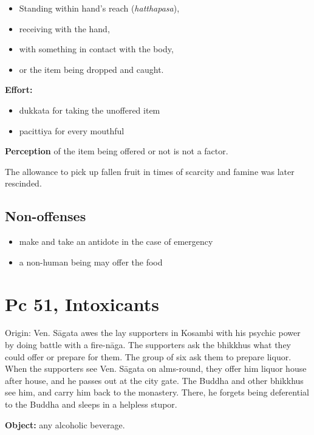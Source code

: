 \begin{itemize}
\tightlist
\item
  Standing within hand's reach (\emph{hatthapasa}),
\item
  receiving with the hand,
\item
  with something in contact with the body,
\item
  or the item being dropped and caught.
\end{itemize}

\textbf{Effort:}

\begin{itemize}
\tightlist
\item
  dukkata for taking the unoffered item
\item
  pacittiya for every mouthful
\end{itemize}

\textbf{Perception} of the item being offered or not is not a factor.

The allowance to pick up fallen fruit in times of scarcity and famine
was later rescinded.

\subsection{Non-offenses}

\begin{itemize}
\tightlist
\item
  make and take an antidote in the case of emergency
\item
  a non-human being may offer the food
\end{itemize}

\clearpage

\section{Pc 51, Intoxicants}

Origin: Ven. Sāgata awes the lay supporters in Kosambi with his psychic
power by doing battle with a fire-nāga. The supporters ask the bhikkhus
what they could offer or prepare for them. The group of six ask them to
prepare liquor. When the supporters see Ven. Sāgata on alms-round, they
offer him liquor house after house, and he passes out at the city gate.
The Buddha and other bhikkhus see him, and carry him back to the
monastery. There, he forgets being deferential to the Buddha and sleeps
in a helpless stupor.

\textbf{Object:} any alcoholic beverage.

